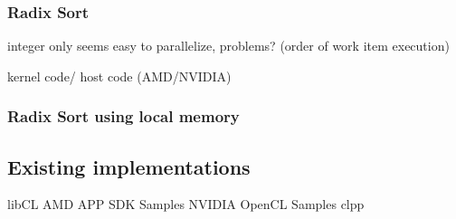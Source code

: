 \subsubsection{Radix Sort}
\label{sec:sorting_radix}
integer only
seems easy to parallelize, problems? (order of work item execution)

kernel code/ host code (AMD/NVIDIA)





\subsubsection{Radix Sort using local memory}
\label{sec:sorting_radix_local}





\subsection{Existing implementations}
libCL
AMD APP SDK Samples
NVIDIA OpenCL Samples
clpp
